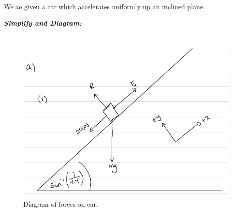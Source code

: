 %
%
%


\begin{subquestions}
	
\subquestion
We ae given a car which accelerates uniformly up an inclined plane.

\begin{subsubquestions}
	
\subsubquestion

\textbf{\textit{Simplify and Diagram:}} \\ \\
\begin{figure}[H]
	\begin{center}
		\includegraphics[scale=0.25]{../2011/figures/2011q5-1}
		\caption{\label{2011:q5:Diagram1} Diagram of forces on car.}
	\end{center}
\end{figure}
	


\end{subsubquestions}
\end{subquestions}
